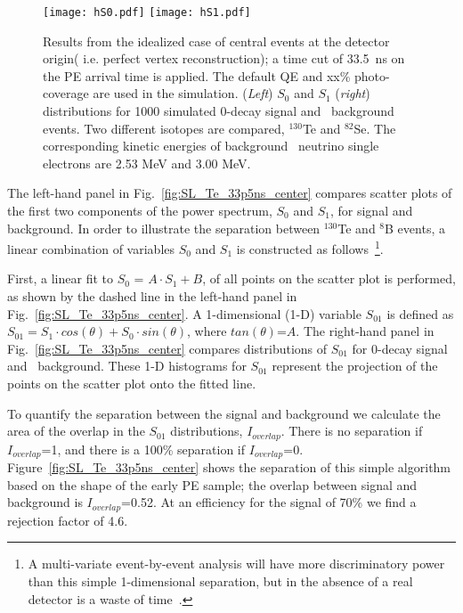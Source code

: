 \begin{figure*}[h]
\centering
\texttt{[image: hS0.pdf]}
\texttt{[image: hS1.pdf]}
\caption{Results from the idealized case of central events at the
  detector origin( i.e. perfect vertex reconstruction); a time cut of 33.5~ns
  on the PE arrival time is applied. The default QE and xx\%
  photo-coverage are used in the simulation.  (\emph{Left}) $S_0$ and
  $S_1$ (\emph{right}) distributions for 1000 simulated 0\nbb-decay
  signal and \B~background events.  Two different isotopes are
  compared, $^{130}$Te and $^{82}$Se. The corresponding kinetic
  energies of background \B~neutrino single electrons are 2.53 MeV and
  3.00 MeV.}
\label{fig:S_vs_energy}
\end{figure*}

The left-hand panel in Fig.~\ref{fig:SL_Te_33p5ns_center} compares
scatter plots of the first two components of the power spectrum, $S_0$
and $S_1$, for signal and background. In order to illustrate the
separation between $^{130}$Te and $^{8}$B events, a linear combination
of variables $S_0$ and $S_1$ is constructed as follows~\footnote{A
multi-variate event-by-event analysis will have more discriminatory
power than this simple 1-dimensional separation, but in the absence of
a real detector is a waste of time~\cite{goldberger_watson}.}.

First, a linear fit to $S_0$ = $A \cdot S_1 + B$, of all points on the
scatter plot is performed, as shown by the dashed line in the left-hand
panel in Fig.~\ref{fig:SL_Te_33p5ns_center}. A 1-dimensional (1-D) variable
$S_{01}$ is defined as $S_{01} = S_1 \cdot cos(\theta) + S_0 \cdot
sin(\theta)$, where $tan(\theta)$=$A$. The right-hand panel in
Fig.~\ref{fig:SL_Te_33p5ns_center} compares distributions of $S_{01}$
for 0\nbb-decay signal and \B~background. These 1-D histograms for
$S_{01}$ represent the projection of the points on the scatter plot
onto the fitted line.

To quantify the separation between the signal and background we
calculate the area of the overlap in the $S_{01}$ distributions,
$I_{overlap}$. There is no separation if $I_{overlap}$=1, and there is
a 100\% separation if
$I_{overlap}$=0. Figure~\ref{fig:SL_Te_33p5ns_center} shows the
separation of this simple algorithm based on the shape of the early PE
sample; the overlap between signal and background is
$I_{overlap}$=0.52. At an efficiency for the signal of
70\% we find a rejection factor of 4.6.

